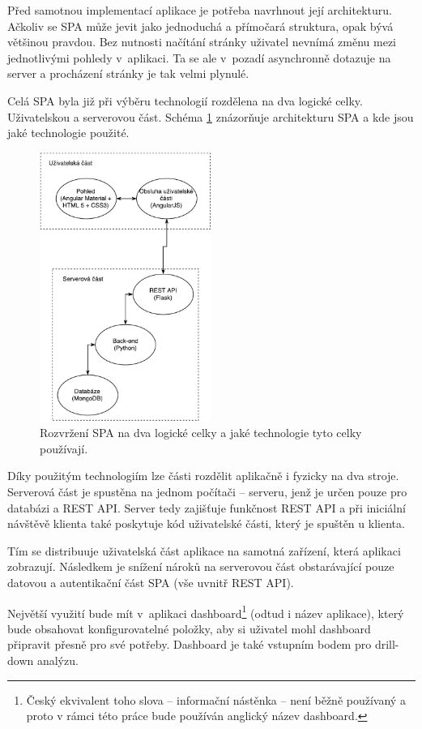 Před samotnou implementací aplikace je potřeba navrhnout její architekturu. Ačkoliv se SPA může jevit jako jednoduchá a přímočará struktura, opak bývá většinou pravdou. Bez nutnosti načítání stránky uživatel nevnímá změnu mezi jednotlivými pohledy v~aplikaci. Ta se ale v~pozadí asynchronně dotazuje na server a procházení stránky je tak velmi plynulé.

Celá SPA byla již při výběru technologií rozdělena na dva logické celky. Uživatelskou a serverovou část. Schéma \ref{fig:system} znázorňuje architekturu SPA a kde jsou jaké technologie použité.

\begin{figure}[ht]
    \centering
    \includegraphics[width=0.5\textwidth]{fig/SPA.pdf}
    \caption{Rozvržení SPA na dva logické celky a jaké technologie tyto celky používají.} \label{fig:system}
\end{figure}

Díky použitým technologiím lze části rozdělit aplikačně i fyzicky na dva stroje. Serverová část je spustěna na jednom počítači -- serveru, jenž je určen pouze pro databázi a REST API. Server tedy zajišťuje funkčnost REST API a při iniciální návštěvě klienta také poskytuje kód uživatelské části, který je spuštěn u klienta.

Tím se distribuuje uživatelská část aplikace na samotná zařízení, která aplikaci zobrazují. Následkem je snížení nároků na serverovou část obstarávající pouze datovou a autentikační část SPA (vše uvnitř REST API).

Největší využití bude mít v~aplikaci dashboard\footnote{Český ekvivalent toho slova -- informační nástěnka -- není běžně používaný a proto v rámci této práce bude používán anglický název dashboard.} (odtud i název aplikace), který bude obsahovat konfigurovatelné položky, aby si uživatel mohl dashboard připravit přesně pro své potřeby. Dashboard je také vstupním bodem pro drill-down analýzu.

